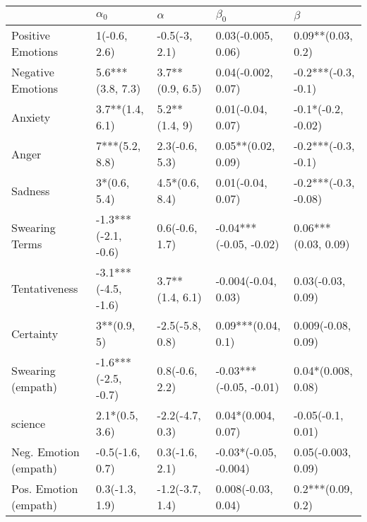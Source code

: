 \begin{tabular}{lllll}
\toprule
{} &           $\alpha_0$ &         $\alpha$ &               $\beta_0$ &               $\beta$ \\
\midrule
Positive Emotions     &         1(-0.6, 2.6) &    -0.5(-3, 2.1) &      0.03(-0.005, 0.06) &     0.09**(0.03, 0.2) \\
Negative Emotions     &     5.6***(3.8, 7.3) &  3.7**(0.9, 6.5) &      0.04(-0.002, 0.07) &   -0.2***(-0.3, -0.1) \\
Anxiety               &      3.7**(1.4, 6.1) &    5.2**(1.4, 9) &       0.01(-0.04, 0.07) &    -0.1*(-0.2, -0.02) \\
Anger                 &       7***(5.2, 8.8) &   2.3(-0.6, 5.3) &      0.05**(0.02, 0.09) &   -0.2***(-0.3, -0.1) \\
Sadness               &         3*(0.6, 5.4) &   4.5*(0.6, 8.4) &       0.01(-0.04, 0.07) &  -0.2***(-0.3, -0.08) \\
Swearing Terms        &  -1.3***(-2.1, -0.6) &   0.6(-0.6, 1.7) &  -0.04***(-0.05, -0.02) &   0.06***(0.03, 0.09) \\
Tentativeness         &  -3.1***(-4.5, -1.6) &  3.7**(1.4, 6.1) &     -0.004(-0.04, 0.03) &     0.03(-0.03, 0.09) \\
Certainty             &          3**(0.9, 5) &  -2.5(-5.8, 0.8) &      0.09***(0.04, 0.1) &    0.009(-0.08, 0.09) \\
Swearing (empath)     &  -1.6***(-2.5, -0.7) &   0.8(-0.6, 2.2) &  -0.03***(-0.05, -0.01) &    0.04*(0.008, 0.08) \\
science               &       2.1*(0.5, 3.6) &  -2.2(-4.7, 0.3) &      0.04*(0.004, 0.07) &     -0.05(-0.1, 0.01) \\
Neg. Emotion (empath) &      -0.5(-1.6, 0.7) &   0.3(-1.6, 2.1) &   -0.03*(-0.05, -0.004) &    0.05(-0.003, 0.09) \\
Pos. Emotion (empath) &       0.3(-1.3, 1.9) &  -1.2(-3.7, 1.4) &      0.008(-0.03, 0.04) &     0.2***(0.09, 0.2) \\
\bottomrule
\end{tabular}
